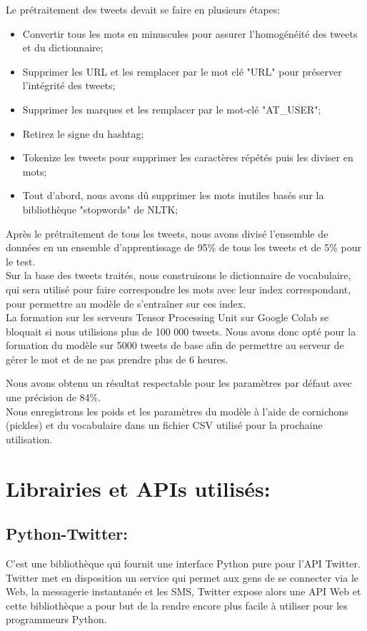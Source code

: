 Le prétraitement des tweets devait se faire en plusieurs étapes:
\begin{itemize}
    \item Convertir tous les mots en minuscules pour assurer l'homogénéité des tweets et du dictionnaire;
    \item Supprimer les URL et les remplacer par le mot clé "URL" pour préserver l'intégrité des tweets;
    \item Supprimer les marques \@ et les remplacer par le mot-clé "AT\_USER";
    \item Retirez le signe du hashtag;
    \item Tokenize les tweets pour supprimer les caractères répétés puis les diviser en mots;
    \item Tout d'abord, nous avons dû supprimer les mots inutiles basés sur la bibliothèque "stopwords" de NLTK;
\end{itemize}

Après le prétraitement de tous les tweets, nous avons divisé l'ensemble de données en un ensemble d'apprentissage de 95\% de tous les tweets et de 5\% pour le test. \\

Sur la base des tweets traités, nous construisons le dictionnaire de vocabulaire, qui sera utilisé pour faire correspondre les mots avec leur index correspondant, pour permettre au modèle de s'entraîner sur ces index.\\

La formation sur les serveurs Tensor Processing Unit sur Google Colab se bloquait si nous utilisions plus de 100 000 tweets. Nous avons donc opté pour la formation du modèle sur 5000 tweets de base afin de permettre au serveur de gérer le mot et de ne pas prendre plus de 6 heures.

Nous avons obtenu un résultat respectable pour les paramètres par défaut avec une précision de 84\%.\\

Nous enregistrons les poids et les paramètres du modèle à l'aide de cornichons (pickles) et du vocabulaire dans un fichier CSV utilisé pour la prochaine utilisation.
\section{Librairies et APIs utilisés:}
\subsection{Python-Twitter:}
C'est une bibliothèque qui fournit une interface Python pure pour l'API Twitter. Twitter met en disposition un service qui permet aux gens de se connecter via le Web, la messagerie instantanée et les SMS, Twitter expose alors une API Web et cette bibliothèque a pour but de la rendre encore plus facile à utiliser pour les programmeurs Python.\cite{py-twitter}
